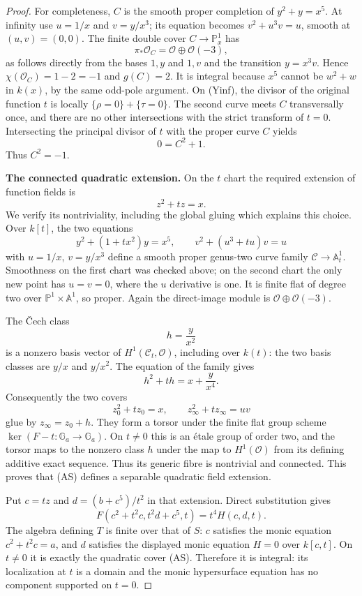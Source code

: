 \begin{proof}
For completeness, $C$ is the smooth proper completion of
$y^2+y=x^5$.  At infinity use $u=1/x$ and $v=y/x^3$; its
equation becomes $v^2+u^3v=u$, smooth at $(u,v)=(0,0)$.
The finite double cover $C\to\mathbb P^1_x$ has
\[
                 \pi_*\mathcal O_C
                    =\mathcal O\oplus\mathcal O(-3),
\]
as follows directly from the bases $1,y$ and $1,v$ and the
transition $y=x^3v$.  Hence $\chi(\mathcal O_C)=1-2=-1$
and $g(C)=2$.  It is integral because $x^5$ cannot be
$w^2+w$ in $k(x)$, by the same odd-pole argument.
On (Yinf), the divisor of the original function $t$ is
locally $\{\rho=0\}+\{\tau=0\}$.  The second curve meets
$C$ transversally once, and there are no other intersections
with the strict transform of $t=0$.  Intersecting the
principal divisor of $t$ with the proper curve $C$ yields
\[
                         0=C^2+1.
\]
Thus $C^2=-1$.

\par\smallskip\noindent\textbf{The connected quadratic extension.}\quad
On the $t$ chart the required extension of function fields is
\[
                            z^2+tz=x.
 \tag{AS}
\]
We verify its nontriviality, including the global gluing which
explains this choice.  Over $k[t]$, the two equations
\[
 y^2+(1+tx^2)y=x^5,
 \qquad v^2+(u^3+tu)v=u
\]
with $u=1/x$, $v=y/x^3$ define a smooth proper genus-two
curve family $\mathcal C\to\mathbb A^1_t$.  Smoothness on
the first chart was checked above; on the second chart the
only new point has $u=v=0$, where the $u$ derivative is one.
It is finite flat of degree two over $\mathbb P^1\times
\mathbb A^1$, so proper.  Again the direct-image module is
$\mathcal O\oplus\mathcal O(-3)$.

The \v Cech class
\[
                             h=\frac y{x^2}
\]
is a nonzero basis vector of $H^1(\mathcal C_t,\mathcal O)$,
including over $k(t)$: the two basis classes are $y/x$ and
$y/x^2$.  The equation of the family gives
\[
                         h^2+th=x+\frac y{x^4}.
\]
Consequently the two covers
\[
 z_0^2+tz_0=x,
       \qquad z_\infty^2+tz_\infty=uv
\]
glue by $z_\infty=z_0+h$.  They form a torsor under the
finite flat group scheme $\ker(F-t:\mathbb G_a\to\mathbb G_a)$.
On $t\ne0$ this is an \'etale group of order two, and the
torsor maps to the nonzero class $h$ under the map to
$H^1(\mathcal O)$ from its defining additive exact sequence.
Thus its generic fibre is nontrivial and connected.  This
proves that (AS) defines a separable quadratic field extension.

Put $c=tz$ and $d=(b+c^5)/t^2$ in that extension.  Direct
substitution gives
\[
          F(c^2+t^2c,t^2d+c^5,t)=t^4H(c,d,t).
 \tag{I}
\]
The algebra defining $T$ is finite over that of $S$: $c$
satisfies the monic equation $c^2+t^2c=a$, and $d$ satisfies
the displayed monic equation $H=0$ over $k[c,t]$.
On $t\ne0$ it is exactly the quadratic cover (AS).  Therefore
it is integral: its localization at $t$ is a domain and the
monic hypersurface equation has no component supported on
$t=0$.


\end{proof}
